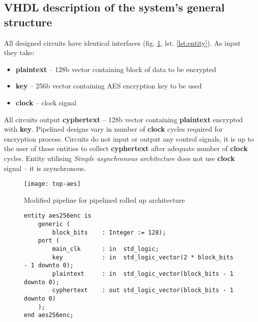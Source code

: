 

\subsection{VHDL description of the system's general structure}
All designed circuits have identical interfaces (fig. \ref{fig:top-aes}, lst. \ref{lst:entity}). As input they take:
\begin{itemize}[noitemsep]
\item \textbf{plaintext} -- 128b vector containing block of data to be encrypted
\item \textbf{key} -- 256b vector containing AES encryption key to be used
\item \textbf{clock} -- clock signal
\end{itemize}
All circuits output \textbf{cyphertext} -- 128b vector containing \textbf{plaintext} encrypted with \textbf{key}. Pipelined designs vary in number of \textbf{clock} cycles required for encryption process. Circuits do not input or output any control signals, it is up to the user of those entities to collect \textbf{cyphertext} after adequate number of \textbf{clock} cycles. Entity utilising \textit{Simple asynchronous architecture} does not use \textbf{clock} signal -- it is asynchronous.

\begin{figure}[!h]
\centering
\texttt{[image: top-aes]}
\caption{Modified pipeline for pipelined rolled up architecture}
\label{fig:top-aes}
\end{figure}

\begin{figure}[!h]
\begin{lstlisting}[style=vhdl, caption={AES encryption VHDL entity}, label={lst:entity}, captionpos=b]
entity aes256enc is
	generic (
		block_bits    : Integer := 128);
	port (
		main_clk      : in  std_logic;
		key           : in  std_logic_vector(2 * block_bits - 1 downto 0);
		plaintext     : in  std_logic_vector(block_bits - 1 downto 0);
		cyphertext    : out std_logic_vector(block_bits - 1 downto 0)
	);
end aes256enc;
\end{lstlisting}
\end{figure}



